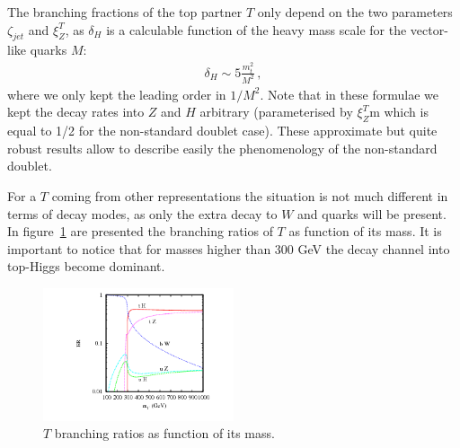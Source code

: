 The branching fractions of the top partner $T$ only depend on the two parameters $\zeta_{jet}$ and $\xi_Z^{T}$, as $\delta_H$ is a calculable function of the heavy mass scale for the vector-like quarks $M$:
\begin{eqnarray} 
\delta_H  \sim 5 \frac{m^2_t}{M^2}\,, \label{eq:deltaH}
\end{eqnarray} 
where we only kept the leading order in $1/M^2$. Note that in these formulae we kept the decay rates into $Z$ and $H$ arbitrary (parameterised by $\xi_Z^{T}$m which is equal to 1/2 for the non-standard doublet case). These approximate but quite robust results allow to describe easily the phenomenology of the non-standard doublet. 

For a $T$ coming from other representations the situation is not much different in terms of decay modes, as only the extra decay to $W$ and quarks will be present. In figure~\ref{fig:TBRs} are presented the branching ratios of $T$ as function of its mass. It is important to notice that for masses higher than 300 GeV the decay channel into top-Higgs become dominant.

\begin{figure}[!Hhtbp]
  \begin{center}
    \includegraphics[width=0.5\textwidth]{figs/pheno_br_tp.png}
    \caption{$T$ branching ratios as function of its mass.}
    \label{fig:TBRs}
  \end{center}
\end{figure}

